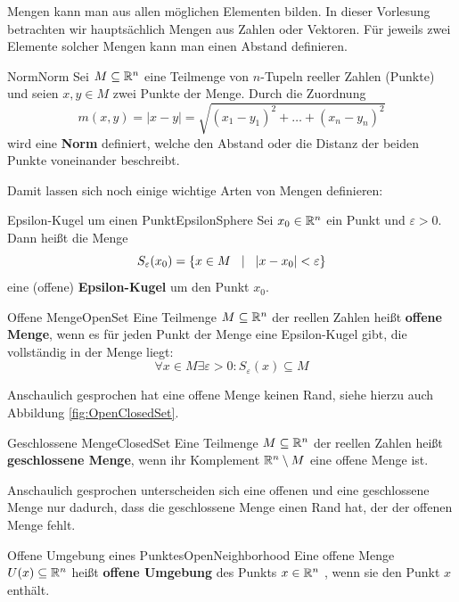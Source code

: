 Mengen kann man aus allen möglichen Elementen bilden. In dieser Vorlesung betrachten wir hauptsächlich Mengen aus Zahlen oder Vektoren. Für jeweils zwei Elemente solcher Mengen kann man einen Abstand definieren.

\begin{definition}{Norm}{Norm}
    Sei $M \subseteq \mathbb{R}^n$ eine Teilmenge von $n$-Tupeln reeller Zahlen (Punkte) und seien $x,y\in M$ zwei Punkte der Menge. Durch die Zuordnung
    $$
        m(x,y) = |x-y| = \sqrt{(x_1-y_1)^2 + \dots + (x_n-y_n)^2}
    $$
    wird eine \textbf{Norm} definiert, welche den Abstand oder die Distanz der beiden Punkte voneinander beschreibt.
\end{definition}

Damit lassen sich noch einige wichtige Arten von Mengen definieren:

\begin{definition}{Epsilon-Kugel um einen Punkt}{EpsilonSphere}
    Sei $x_0\in\mathbb{R}^n$ ein Punkt und $\varepsilon > 0$. Dann heißt die Menge
    $$
        S_\varepsilon(x_0) = \lbrace x \in M \hspace{3mm} | \hspace{3mm} |x-x_0| < \varepsilon \rbrace
    $$
    eine (offene) \textbf{Epsilon-Kugel} um den Punkt $x_0$.
\end{definition}

\begin{definition}{Offene Menge}{OpenSet}
    Eine Teilmenge $M \subseteq \mathbb{R}^n$ der reellen Zahlen heißt \textbf{offene Menge}, wenn es für jeden Punkt der Menge eine Epsilon-Kugel gibt, die vollständig in der Menge liegt:
    $$
        \forall x \in M \exists \varepsilon > 0: S_\varepsilon(x) \subseteq M
    $$
\end{definition}

Anschaulich gesprochen hat eine offene Menge keinen Rand, siehe hierzu auch Abbildung \ref{fig:OpenClosedSet}.

\begin{definition}{Geschlossene Menge}{ClosedSet}
    Eine Teilmenge $M \subseteq \mathbb{R}^n$ der reellen Zahlen heißt \textbf{geschlossene Menge}, wenn ihr Komplement $\mathbb{R}^n \setminus M$ eine offene Menge ist.
\end{definition}

Anschaulich gesprochen unterscheiden sich eine offenen und eine geschlossene Menge nur dadurch, dass die geschlossene Menge einen Rand hat, der der offenen Menge fehlt.

\begin{definition}{Offene Umgebung eines Punktes}{OpenNeighborhood}
    Eine offene Menge $U(x) \subseteq \mathbb{R}^n$ heißt \textbf{offene Umgebung} des Punkts $x \in \mathbb{R}^n$ , wenn sie den Punkt $x$ enthält.
\end{definition}

